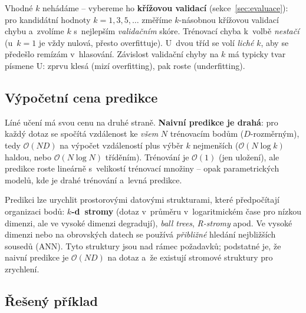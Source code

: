 \begin{intuice}
Vhodné $k$ nehádáme -- vybereme ho \textbf{křížovou validací} (sekce~\ref{sec:evaluace}): pro kandidátní hodnoty $k=1,3,5,\dots$ změříme $k$-násobnou křížovou validací chybu a~zvolíme $k$ s~nejlepším \emph{validačním} skóre. Trénovací chyba k~volbě \emph{nestačí} (u~$k=1$ je vždy nulová, přesto overfittuje). U~dvou tříd se volí \emph{liché} $k$, aby se předešlo remízám v~hlasování. Závislost validační chyby na $k$ má typicky tvar písmene U: zprvu klesá (mizí overfitting), pak roste (underfitting).
\end{intuice}

\subsection{Výpočetní cena predikce}

Líné učení má svou cenu na druhé straně. \textbf{Naivní predikce je drahá}: pro každý dotaz se spočítá vzdálenost ke \emph{všem} $N$ trénovacím bodům ($D$-rozměrným), tedy $\mathcal{O}(N D)$ na výpočet vzdáleností plus výběr $k$ nejmenších ($\mathcal{O}(N\log k)$ haldou, nebo $\mathcal{O}(N\log N)$ tříděním). Trénování je $\mathcal{O}(1)$ (jen uložení), ale predikce roste lineárně s~velikostí trénovací množiny -- opak parametrických modelů, kde je drahé trénování a~levná predikce.

\begin{poznamka}
Predikci lze urychlit prostorovými datovými strukturami, které předpočítají organizaci bodů: \textbf{$k$-d~stromy} (dotaz v~průměru v~logaritmickém čase pro nízkou dimenzi, ale ve vysoké dimenzi degradují), \emph{ball trees}, \emph{R-stromy} apod. Ve vysoké dimenzi nebo na obrovských datech se používá \emph{přibližné} hledání nejbližších sousedů (ANN). Tyto struktury jsou nad rámec požadavků; podstatné je, že naivní predikce je $\mathcal{O}(ND)$ na dotaz a~že existují stromové struktury pro zrychlení.
\end{poznamka}

\subsection{Řešený příklad}

